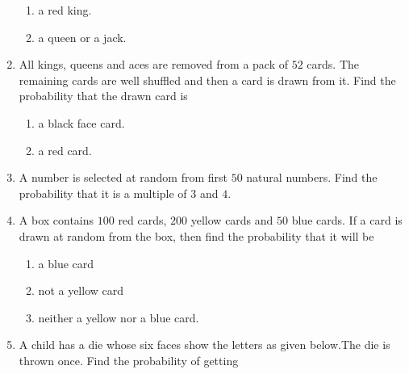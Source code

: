 \documentclass[journal,12pt,onecolumn]{IEEEtran}
\theoremstyle{remark}
\begin{document}
\begin{enumerate}
\begin{enumerate}[label=\Roman*.]
\item a red king.\\
\item a queen or a jack.\\
\end{enumerate}
\item All kings, queens and aces are removed from a pack of $52$ cards. The remaining cards are well shuffled and then a card is drawn from it. Find the probability that the drawn card is \\
\begin{enumerate}[label=\Roman*.]
\item a black face card.\\
\item a red card.\\
\end{enumerate}

\item A number is selected at random from first $50$ natural numbers. Find the probability that it is a multiple of $3$ and $4$.\\
\item A box contains $100$ red cards, $200$ yellow cards and $50$ blue cards. If a card is drawn at random from the box, then find the probability that it will be \begin{enumerate}[label=\Roman*.]
\item a blue card\\
\item not a yellow card\\
\item neither a yellow nor a blue card.\\
\end{enumerate}

\item A child has a die whose six faces show the letters as given below.The die is thrown once. Find the probability of getting\\
\begin{figure}[ht]
\centering
{}
\end{figure}
\end{enumerate}
\end{document}

